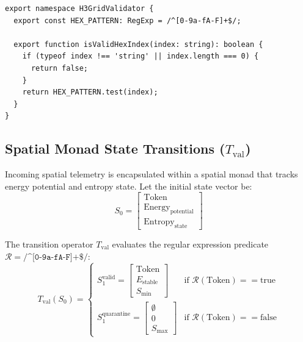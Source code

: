 \documentclass[11pt, a4paper]{article}
\begin{document}
\begin{lstlisting}
export namespace H3GridValidator {
  export const HEX_PATTERN: RegExp = /^[0-9a-fA-F]+$/;

  export function isValidHexIndex(index: string): boolean {
    if (typeof index !== 'string' || index.length === 0) {
      return false;
    }
    return HEX_PATTERN.test(index);
  }
}
\end{lstlisting}

\subsection{Spatial Monad State Transitions ($T_{\text{val}}$)}
Incoming spatial telemetry is encapsulated within a spatial monad that tracks energy potential and entropy state. Let the initial state vector be:
\begin{equation}
S_0 = \begin{bmatrix} \text{Token} \\ \text{Energy}_{\text{potential}} \\ \text{Entropy}_{\text{state}} \end{bmatrix}
\end{equation}

The transition operator $T_{\text{val}}$ evaluates the regular expression predicate $\mathcal{R} = \texttt{/^[0-9a-fA-F]+\$/}$:
\begin{equation}
T_{\text{val}}(S_0) = \begin{cases} 
S_1^{\text{valid}} = \begin{bmatrix} \text{Token} \\ E_{\text{stable}} \\ S_{\text{min}} \end{bmatrix} & \text{if } \mathcal{R}(\text{Token}) == \text{true} \\
S_1^{\text{quarantine}} = \begin{bmatrix} \emptyset \\ 0 \\ S_{\text{max}} \end{bmatrix} & \text{if } \mathcal{R}(\text{Token}) == \text{false}
\end{cases}
\end{equation}
\end{document}
